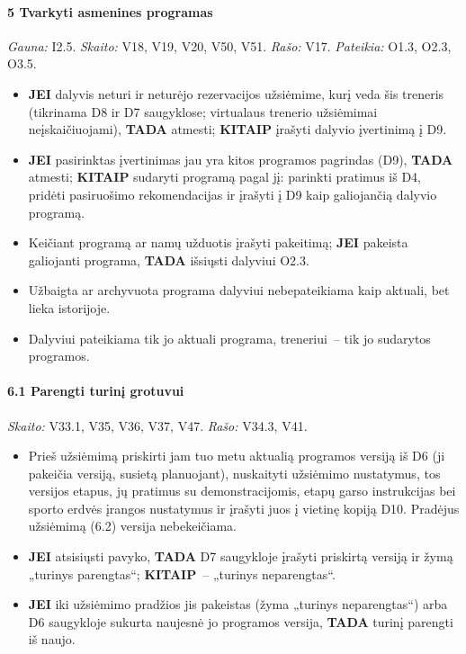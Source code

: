 \paragraph{5 Tvarkyti asmenines programas}\mbox{}\par
{\small \textit{Gauna:} I2.5. \textit{Skaito:} V18, V19, V20, V50, V51. \textit{Rašo:} V17. \textit{Pateikia:} O1.3, O2.3, O3.5.}
\begin{itemize}
  \item \textbf{JEI} dalyvis neturi ir neturėjo rezervacijos užsiėmime, kurį veda šis treneris (tikrinama D8 ir D7 saugyklose; virtualaus trenerio užsiėmimai neįskaičiuojami), \textbf{TADA} atmesti; \textbf{KITAIP} įrašyti dalyvio įvertinimą į D9.
  \item \textbf{JEI} pasirinktas įvertinimas jau yra kitos programos pagrindas (D9), \textbf{TADA} atmesti; \textbf{KITAIP} sudaryti programą pagal jį: parinkti pratimus iš D4, pridėti pasiruošimo rekomendacijas ir įrašyti į D9 kaip galiojančią dalyvio programą.
  \item Keičiant programą ar namų užduotis įrašyti pakeitimą; \textbf{JEI} pakeista galiojanti programa, \textbf{TADA} išsiųsti dalyviui O2.3.
  \item Užbaigta ar archyvuota programa dalyviui nebepateikiama kaip aktuali, bet lieka istorijoje.
  \item Dalyviui pateikiama tik jo aktuali programa, treneriui~– tik jo sudarytos programos.
\end{itemize}
\paragraph{6.1 Parengti turinį grotuvui}\mbox{}\par
{\small \textit{Skaito:} V33.1, V35, V36, V37, V47. \textit{Rašo:} V34.3, V41.}
\begin{itemize}
  \item Prieš užsiėmimą priskirti jam tuo metu aktualią programos versiją iš D6 (ji pakeičia versiją, susietą planuojant), nuskaityti užsiėmimo nustatymus, tos versijos etapus, jų pratimus su demonstracijomis, etapų garso instrukcijas bei sporto erdvės įrangos nustatymus ir įrašyti juos į vietinę kopiją D10. Pradėjus užsiėmimą (6.2) versija nebekeičiama.
  \item \textbf{JEI} atsisiųsti pavyko, \textbf{TADA} D7 saugykloje įrašyti priskirtą versiją ir žymą „turinys parengtas“; \textbf{KITAIP}~– „turinys neparengtas“.
  \item \textbf{JEI} iki užsiėmimo pradžios jis pakeistas (žyma „turinys neparengtas“) arba D6 saugykloje sukurta naujesnė jo programos versija, \textbf{TADA} turinį parengti iš naujo.
\end{itemize}
